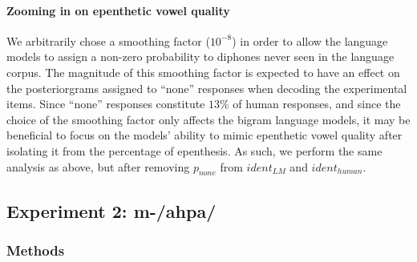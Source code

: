 \paragraph{{\color{red}Zooming in on epenthetic vowel quality}}
We arbitrarily chose a smoothing factor ($10^{-8}$)  in order to allow the language models to assign a non-zero probability to diphones never seen in the language corpus. The magnitude of this smoothing factor is expected to have an effect on the posteriorgrams assigned to ``none'' responses when decoding the experimental items. Since ``none'' responses constitute $13\%$ of human responses, and since the choice of the smoothing factor only affects the bigram language models, it may be beneficial to focus on the models' ability to mimic epenthetic vowel quality after isolating it from the percentage of epenthesis. As such, we perform the same analysis as above, but after removing $p_{none}$ from $ident_{LM}$ and $ident_{human}$. 

\subsection{Experiment 2: {\color{red}m-/ahpa/}}
\subsubsection{Methods}
